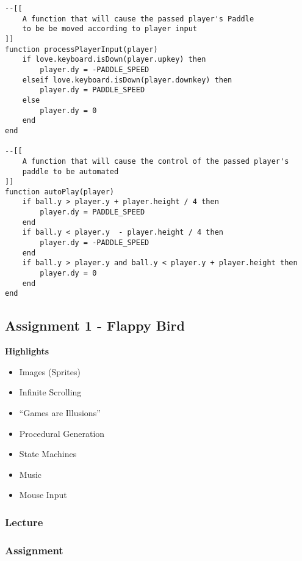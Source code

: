 \begin{lstlisting}[language={[5.0]Lua}]
--[[
    A function that will cause the passed player's Paddle 
    to be be moved according to player input
]]
function processPlayerInput(player)
    if love.keyboard.isDown(player.upkey) then
        player.dy = -PADDLE_SPEED
    elseif love.keyboard.isDown(player.downkey) then
        player.dy = PADDLE_SPEED
    else
        player.dy = 0
    end
end   

--[[
    A function that will cause the control of the passed player's
    paddle to be automated
]]
function autoPlay(player)
    if ball.y > player.y + player.height / 4 then
        player.dy = PADDLE_SPEED
    end
    if ball.y < player.y  - player.height / 4 then
        player.dy = -PADDLE_SPEED
    end
    if ball.y > player.y and ball.y < player.y + player.height then
        player.dy = 0
    end 
end   
\end{lstlisting}
\newpage
\subsection{Assignment 1 - Flappy Bird}

\begin{featurebox}
\textbf{Highlights}
\begin{itemize}
\item Images (Sprites)
\item Infinite Scrolling
\item “Games are Illusions”
\item Procedural Generation
\item State Machines
\item Music
\item Mouse Input
\end{itemize}
\end{featurebox}

\subsubsection{Lecture}

\subsubsection{Assignment}

